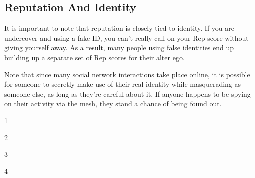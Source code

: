 \subsection{Reputation And Identity}

It is important to note that reputation is closely tied 
to identity. If you are undercover and using a fake ID, 
you can't really call on your Rep score without giving 
yourself away. As a result, many people using false 
identities end up building up a separate set of Rep 
scores for their alter ego.

Note that since many social network interactions 
take place online, it is possible for someone to secretly 
make use of their real identity while masquerading 
as someone else, as long as they're careful about it. If 
anyone happens to be spying on their activity via the 
mesh, they stand a chance of being found out.

1

2

3

4

